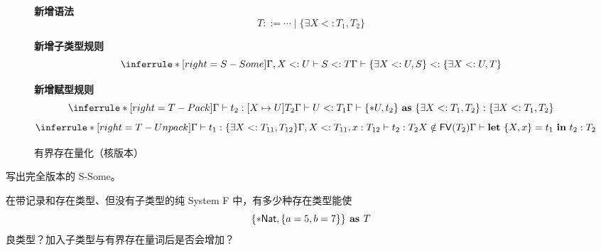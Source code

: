 \begin{figure}[!ht]
\centering
\begin{minipage}{0.96\linewidth}
\textbf{新增语法}
\[
T::=\cdots\mid\{\exists X<:T_1,T_2\}
\]

\textbf{新增子类型规则}
\[
\inferrule*[right=S-Some]
 {\Gamma,X<:U\vdash S<:T}
 {\Gamma\vdash
  \{\exists X<:U,S\}<:\{\exists X<:U,T\}}
\]

\textbf{新增赋型规则}
\[
\inferrule*[right=T-Pack]
 {\Gamma\vdash t_2:[X\mapsto U]T_2\\
  \Gamma\vdash U<:T_1}
 {\Gamma\vdash
  \{*U,t_2\}\ \textbf{as}\ \{\exists X<:T_1,T_2\}:
  \{\exists X<:T_1,T_2\}}
\]
\[
\inferrule*[right=T-Unpack]
 {\Gamma\vdash t_1:\{\exists X<:T_{11},T_{12}\}\\
  \Gamma,X<:T_{11},x:T_{12}\vdash t_2:T_2\\
  X\notin\taplterm{FV}(T_2)}
 {\Gamma\vdash
  \textbf{let}\ \{X,x\}=t_1\ \textbf{in}\ t_2:T_2}
\]
\end{minipage}
\caption{有界存在量化（核版本）}
\label{fig:26-3}
\end{figure}
\FloatBarrier

\begin{exercise}[\(\star\)]
\label{ex:26.5.1}
写出完全版本的 S-Some。
\end{exercise}

\begin{exercise}[\(\star\)]
\label{ex:26.5.2}
在带记录和存在类型、但没有子类型的纯 System F 中，有多少种存在类型能使
\[
\{*\mathsf{Nat},\{a=5,b=7\}\}\textbf{ as }T
\]
良类型？加入子类型与有界存在量词后是否会增加？
\end{exercise}

